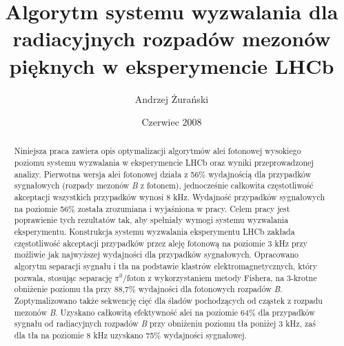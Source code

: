 \documentclass{pracamgr}
\author{Andrzej Żurański}
\title{Algorytm systemu wyzwalania dla radiacyjnych rozpadów mezonów pięknych w eksperymencie LHCb}
\date{Czerwiec 2008}
\begin{document}
\baselineskip=18pt
\maketitle

\begin{abstract}
Niniejsza praca zawiera opis optymalizacji algorytmów alei fotonowej wysokiego poziomu systemu wyzwalania w eksperymencie LHCb oraz wyniki przeprowadzonej analizy. Pierwotna wersja alei fotonowej działa z 56\% wydajnością dla przypadków sygnałowych (rozpady mezonów \textit{B} z fotonem), jednocześnie całkowita częstotliwość akceptacji wszystkich przypadków wynosi 8 kHz. Wydajność przypadków sygnałowych na poziomie 56\% została zrozumiana i wyjaśniona w pracy. Celem pracy jest poprawienie tych rezultatów tak, aby spełniały wymogi systemu wyzwalania eksperymentu. Konstrukcja systemu wyzwalania eksperymentu LHCb zakłada częstotliwość akceptacji przypadków przez aleję fotonową na poziomie 3 kHz przy możliwie jak najwyższej wydajności dla przypadków sygnałowych. Opracowano algorytm separacji sygnału i tła na podstawie klastrów elektromagnetycznych, który pozwala, stosując separację $\pi^0$/foton z wykorzystaniem metody Fishera, na 3-krotne obniżenie poziomu tła przy 88,7\% wydajności dla fotonowych rozpadów \textit{B}. Zoptymalizowano także sekwencję cięć dla śladów pochodzących od cząstek z rozpadu mezonów \textit{B}. Uzyskano całkowitą efektywność alei na poziomie 64\% dla przypadków sygnału od radiacyjnych rozpadów \textit{B} przy obniżeniu poziomu tła poniżej 3 kHz, zaś dla tła na poziomie 8 kHz uzyskano 75\% wydajności sygnałowej. 
\end{abstract}



\tableofcontents
\end{document}
